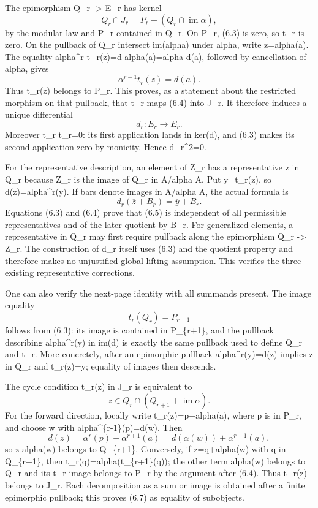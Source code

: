 The epimorphism Q\_r -\textgreater{} E\_r has kernel \[
Q_r\cap J_r=P_r+(Q_r\cap\operatorname{im}\alpha),           \tag{6.4}
\] by the modular law and P\_r contained in Q\_r. On P\_r, (6.3) is zero, so t\_r is zero. On the pullback of Q\_r intersect im(alpha) under alpha, write z=alpha(a). The equality alpha\^{}r t\_r(z)=d alpha(a)=alpha d(a), followed by cancellation of alpha, gives \[
\alpha^{r-1}t_r(z)=d(a).
\] Thus t\_r(z) belongs to P\_r. This proves, as a statement about the restricted morphism on that pullback, that t\_r maps (6.4) into J\_r. It therefore induces a unique differential \[
d_r:E_r\longrightarrow E_r.
\] Moreover t\_r t\_r=0: its first application lands in ker(d), and (6.3) makes its second application zero by monicity. Hence d\_r\^{}2=0.

For the representative description, an element of Z\_r has a representative z in Q\_r because Z\_r is the image of Q\_r in A/alpha A. Put y=t\_r(z), so d(z)=alpha\^{}r(y). If bars denote images in A/alpha A, the actual formula is \[
d_r(\overline z+B_r)=\overline y+B_r.                     \tag{6.5}
\] Equations (6.3) and (6.4) prove that (6.5) is independent of all permissible representatives and of the later quotient by B\_r. For generalized elements, a representative in Q\_r may first require pullback along the epimorphism Q\_r -\textgreater{} Z\_r. The construction of d\_r itself uses (6.3) and the quotient property and therefore makes no unjustified global lifting assumption. This verifies the three existing representative corrections.

One can also verify the next-page identity with all summands present. The image equality \[
t_r(Q_r)=P_{r+1}                                         \tag{6.6}
\] follows from (6.3): its image is contained in P\_\{r+1\}, and the pullback describing alpha\^{}r(y) in im(d) is exactly the same pullback used to define Q\_r and t\_r. More concretely, after an epimorphic pullback alpha\^{}r(y)=d(z) implies z in Q\_r and t\_r(z)=y; equality of images then descends.

The cycle condition t\_r(z) in J\_r is equivalent to \[
z\in Q_r\cap(Q_{r+1}+\operatorname{im}\alpha).             \tag{6.7}
\] For the forward direction, locally write t\_r(z)=p+alpha(a), where p is in P\_r, and choose w with alpha\^{}\{r-1\}(p)=d(w). Then \[
d(z)=\alpha^r(p)+\alpha^{r+1}(a)
     =d(\alpha(w))+\alpha^{r+1}(a),
\] so z-alpha(w) belongs to Q\_\{r+1\}. Conversely, if z=q+alpha(w) with q in Q\_\{r+1\}, then t\_r(q)=alpha(t\_\{r+1\}(q)); the other term alpha(w) belongs to Q\_r and its t\_r image belongs to P\_r by the argument after (6.4). Thus t\_r(z) belongs to J\_r. Each decomposition as a sum or image is obtained after a finite epimorphic pullback; this proves (6.7) as equality of subobjects.

